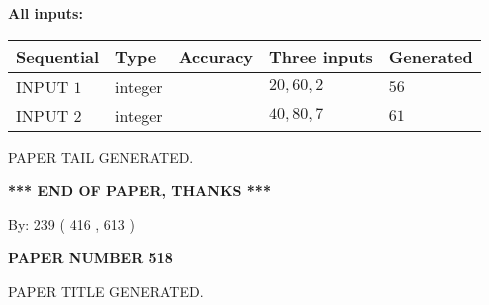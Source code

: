 \documentclass[12pt]{article}
\begin{document}
   
   
   
\noindent\vspace{0.1in}\hspace{-0.08in} {\textbf{\Large{All inputs: }}}
   
   
  
  
\noindent\begin{tabular}{|l|l|l|l|l|}
\hline
 Sequential & Type & Accuracy & Three inputs & Generated \\ 
\hline
 
 
  INPUT $  1 $ & integer &  & $
 20
 , 
 60
 , 
 2
 $ & $ 56 $ 
 \\  \hline  
 
 
  INPUT $  2 $ & integer &  & $
 40
 , 
 80
 , 
 7
 $ & $ 61 $ 
 \\  \hline  
 \end{tabular}
   
   
   
   
   
   
 \vspace{0.2in}
 
   
   
\vspace{2.0in} PAPER TAIL GENERATED.
   
   
   
   
\vspace{1.0in} 
{\textbf{\large{ *** END OF PAPER, THANKS *** }}} 
   
   
\hspace{1.0in} By: 
 239 ( 416 ,  613 )
   
   
   
   
\newpage 
\setcounter{page}{ 
   518001 } 
   
   
   
   
 {\textbf{ \Large{ PAPER NUMBER  518  }}}
   
   
\vspace{0.2in}
   
   
   
   
   
   
   
   
 \vspace{0.2in}
 
 
 
 
   
   
 PAPER TITLE GENERATED.
   
   
   
\vspace{0.2in}
   
\end{document}
